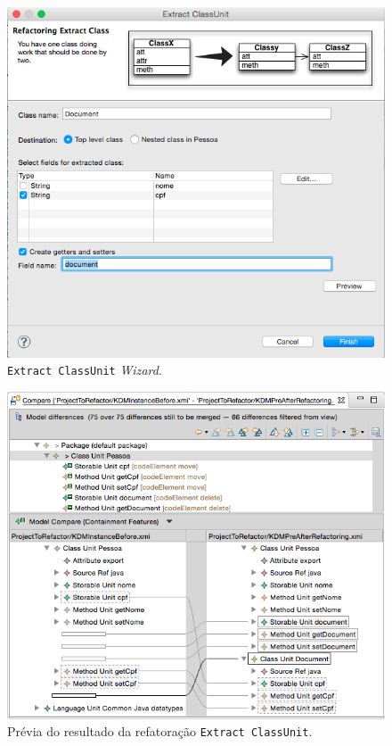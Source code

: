 \begin{figure}[h]
	\centering
	\caption{\texttt{Extract ClassUnit} \textit{Wizard}.}
	\label{fig:kdm_re_wizard_extract_class}
	\includegraphics[scale=0.5]{images/extractClassEasierToExplainerEMFCOmpare}
	\fautor
\end{figure}

\begin{figure}[h]
	\centering
	\caption{Prévia do resultado da refatoração \texttt{Extract ClassUnit}.}
	\label{fig:previa_resultado_extractClassUnit}
	\includegraphics[scale=0.5]{images/previaRefatoracaoExtractClassUnitEMFCOmpare}
	\fautor
\end{figure}


